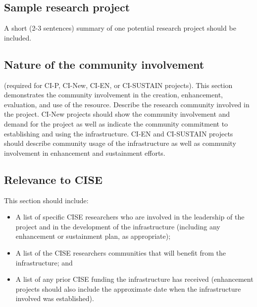 \subsection{Sample research project}
A short (2-3 sentences) summary of one potential research project 
should be included.

\subsection{Nature of the community involvement}
(required for CI-P, CI-New, CI-EN, or CI-SUSTAIN projects). This 
section demonstrates the community involvement in the creation, 
enhancement, evaluation, and use of the resource. Describe the research 
community involved in the project. CI-New projects should show the 
community involvement and demand for the project as well as indicate 
the community commitment to establishing and using the infrastructure. 
CI-EN and CI-SUSTAIN projects should describe community usage of the 
infrastructure as well as community involvement in enhancement and 
sustainment efforts.

\subsection{Relevance to CISE}
This section should include:
\begin{itemize}
  \item A list of specific CISE researchers who are involved in the leadership of the project and in the development of the infrastructure (including any enhancement or sustainment plan, as appropriate);
  \item A list of the CISE researchers communities that will benefit from the infrastructure; and
  \item A list of any prior CISE funding the infrastructure has received (enhancement projects should also include the approximate date when the infrastructure involved was established).
\end{itemize}

